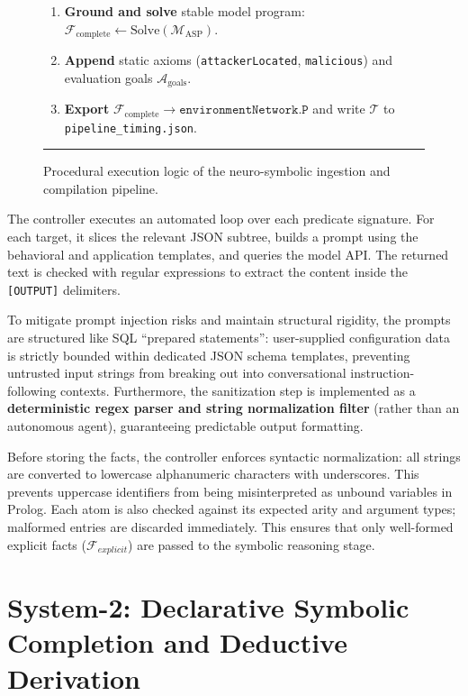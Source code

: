 \documentclass[target=mst,aauheader=aics,style=]{thud}
\begin{document}
\begin{figure}[htbp]
\begin{minipage}{0.96\textwidth}
\begin{enumerate}
    \item \textbf{Ground and solve} stable model program: $\mathcal{F}_{\text{complete}} \gets \text{Solve}(\mathcal{M}_{\text{ASP}})$.
    \item \textbf{Append} static axioms (\texttt{attackerLocated}, \texttt{malicious}) and evaluation goals $\mathcal{A}_{\text{goals}}$.
    \item \textbf{Export} $\mathcal{F}_{\text{complete}} \to \texttt{environmentNetwork.P}$ and write $\mathcal{T}$ to \texttt{pipeline\_timing.json}.
\end{enumerate}
\vspace{3pt}\hrule
\end{minipage}
\caption{Procedural execution logic of the neuro-symbolic ingestion and compilation pipeline.}
\label{fig:llmasp_algorithmic_flow}
\end{figure}

The controller executes an automated loop over each predicate signature. For each target, it slices the relevant JSON subtree, builds a prompt using the behavioral and application templates, and queries the model API. The returned text is checked with regular expressions to extract the content inside the \texttt{[OUTPUT]} delimiters.

To mitigate prompt injection risks and maintain structural rigidity, the prompts are structured like SQL ``prepared statements'': user-supplied configuration data is strictly bounded within dedicated JSON schema templates, preventing untrusted input strings from breaking out into conversational instruction-following contexts. Furthermore, the sanitization step is implemented as a \textbf{deterministic regex parser and string normalization filter} (rather than an autonomous agent), guaranteeing predictable output formatting.

Before storing the facts, the controller enforces syntactic normalization: all strings are converted to lowercase alphanumeric characters with underscores. This prevents uppercase identifiers from being misinterpreted as unbound variables in Prolog. Each atom is also checked against its expected arity and argument types; malformed entries are discarded immediately. This ensures that only well-formed explicit facts ($\mathcal{F}_{explicit}$) are passed to the symbolic reasoning stage.

\section{System-2: Declarative Symbolic Completion and Deductive \\Derivation}
\label{sec:system2_implementation}
\end{document}

